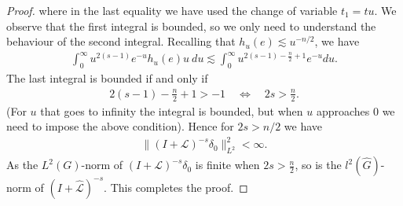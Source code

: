 \documentclass[12pt,oneside,a4paper]{book}
\numberwithin{equation}{section}     %
\theoremstyle{plain}
\theoremstyle{definition}
\newcommand{\slp}{{\mathcal L}}
\newcommand{\Gh}{{\widehat{G}}}
\begin{document}
\begin{proof}
	where in the last equality we have used the change of variable $t_1=tu$. We observe that the first integral is bounded, so we only need to understand the behaviour of the second integral. Recalling that $h_u(e)\lesssim u^{-n/2}$, we have
	\begin{align*}
	\int_0^\infty u^{2(s-1)}e^{-u}h_u(e)u~du\lesssim \int_0^\infty u^{2(s-1)-\frac{n}{2}+1}e^{-u}du.
	\end{align*}
	The last integral is bounded if and only if 
	\begin{align*}
	2(s-1)-\frac{n}{2}+1>-1\quad\iff\quad 2s>\frac{n}{2}.
	\end{align*}  
	(For $u$ that goes to infinity the integral is bounded, but when $u$ approaches $0$ we need to impose the above condition). Hence for $2s>n/2$ we have
	\begin{align*}
	\|(I+\slp)^{-s}\delta_0\|_{L^2}^2<\infty.
	\end{align*}
	As the $L^2(G)$-norm of $(I+\slp)^{-s}\delta_0$ is finite when $2s>\frac{n}{2}$, so is the $l^2(\Gh)$-norm of $(I+\widehat{\slp})^{-s}$. This completes the proof.
\end{proof}
\end{document}
